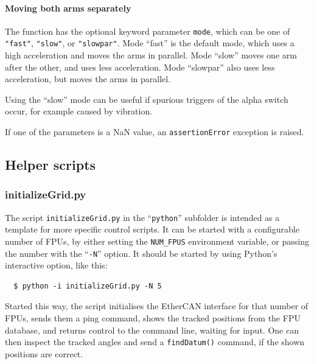 \documentclass[11pt,a4paper]{report}
\begin{document}
\paragraph{Moving both arms separately}

The function has the optional keyword parameter \texttt{mode}, which
can be one of \texttt{"fast"}, \texttt{"slow"}, or \texttt{"slowpar"}.
Mode ``fast'' is the default mode, which uses a high acceleration and
moves the arms in parallel. Mode ``slow'' moves one arm after the
other, and uses less acceleration. Mode ``slowpar'' also uses less
acceleration, but moves the arms in parallel.

Using the ``slow'' mode can be useful if spurious triggers of the
alpha switch occur, for example caused by vibration.

If one of the parameters is a NaN value, an \texttt{assertionError}
exception is raised.

\subsection{Helper scripts}

\subsubsection{initializeGrid.py}
\label{sec:initializegrid}

The script \texttt{initializeGrid.py} in the ``\texttt{python}''
subfolder is intended as a template for more specific control scripts.
It can be started with a configurable number of FPUs, by either
setting the \texttt{NUM\_FPUS} environment variable, or passing the
number with the ``\texttt{-N}'' option. It should be started by using
Python's interactive option, like this:

\begin{verbatim}
  $ python -i initializeGrid.py -N 5
\end{verbatim}

Started this way, the script initialises the EtherCAN interface for that number of
FPUs, sends them a ping command, shows the tracked positions from the
FPU database, and returns control to the command line, waiting for
input. One can then inspect the tracked angles and send a
\texttt{findDatum()} command, if the shown positions are correct.
\end{document}
